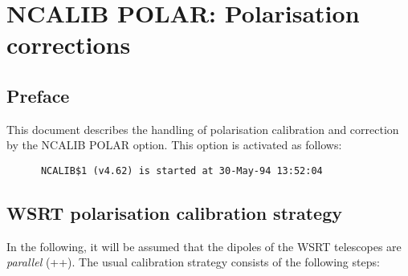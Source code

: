 %


\chapter{NCALIB POLAR: Polarisation corrections}
\tableofcontents



\section{ Preface }

	This document describes the handling of polarisation calibration and
correction by the NCALIB POLAR option.  This option is activated as follows:

\spbegin %
\svbegin \begin{verbatim}
      NCALIB$1 (v4.62) is started at 30-May-94 13:52:04
\end{verbatim}\svend
\spend %
%
\spbegin %
\spend %
%
\spbegin %
\spend %



\section{WSRT polarisation calibration strategy}
\label{.strategy}

	In the following, it will be assumed that the dipoles of the WSRT
telescopes are {\em parallel} (++).  The usual calibration strategy consists of
the following steps:

